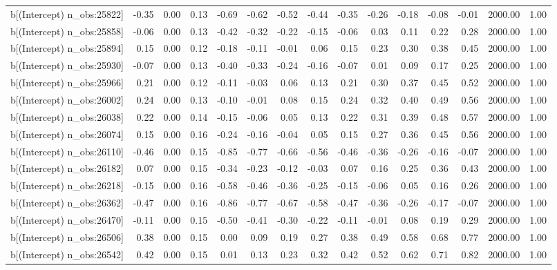 \begin{table}[ht]
\begin{tabular}{rrrrrrrrrrrrrrr}
  b[(Intercept) n\_obs:25822] & -0.35 & 0.00 & 0.13 & -0.69 & -0.62 & -0.52 & -0.44 & -0.35 & -0.26 & -0.18 & -0.08 & -0.01 & 2000.00 & 1.00 \\ 
  b[(Intercept) n\_obs:25858] & -0.06 & 0.00 & 0.13 & -0.42 & -0.32 & -0.22 & -0.15 & -0.06 & 0.03 & 0.11 & 0.22 & 0.28 & 2000.00 & 1.00 \\ 
  b[(Intercept) n\_obs:25894] & 0.15 & 0.00 & 0.12 & -0.18 & -0.11 & -0.01 & 0.06 & 0.15 & 0.23 & 0.30 & 0.38 & 0.45 & 2000.00 & 1.00 \\ 
  b[(Intercept) n\_obs:25930] & -0.07 & 0.00 & 0.13 & -0.40 & -0.33 & -0.24 & -0.16 & -0.07 & 0.01 & 0.09 & 0.17 & 0.25 & 2000.00 & 1.00 \\ 
  b[(Intercept) n\_obs:25966] & 0.21 & 0.00 & 0.12 & -0.11 & -0.03 & 0.06 & 0.13 & 0.21 & 0.30 & 0.37 & 0.45 & 0.52 & 2000.00 & 1.00 \\ 
  b[(Intercept) n\_obs:26002] & 0.24 & 0.00 & 0.13 & -0.10 & -0.01 & 0.08 & 0.15 & 0.24 & 0.32 & 0.40 & 0.49 & 0.56 & 2000.00 & 1.00 \\ 
  b[(Intercept) n\_obs:26038] & 0.22 & 0.00 & 0.14 & -0.15 & -0.06 & 0.05 & 0.13 & 0.22 & 0.31 & 0.39 & 0.48 & 0.57 & 2000.00 & 1.00 \\ 
  b[(Intercept) n\_obs:26074] & 0.15 & 0.00 & 0.16 & -0.24 & -0.16 & -0.04 & 0.05 & 0.15 & 0.27 & 0.36 & 0.45 & 0.56 & 2000.00 & 1.00 \\ 
  b[(Intercept) n\_obs:26110] & -0.46 & 0.00 & 0.15 & -0.85 & -0.77 & -0.66 & -0.56 & -0.46 & -0.36 & -0.26 & -0.16 & -0.07 & 2000.00 & 1.00 \\ 
  b[(Intercept) n\_obs:26182] & 0.07 & 0.00 & 0.15 & -0.34 & -0.23 & -0.12 & -0.03 & 0.07 & 0.16 & 0.25 & 0.36 & 0.43 & 2000.00 & 1.00 \\ 
  b[(Intercept) n\_obs:26218] & -0.15 & 0.00 & 0.16 & -0.58 & -0.46 & -0.36 & -0.25 & -0.15 & -0.06 & 0.05 & 0.16 & 0.26 & 2000.00 & 1.00 \\ 
  b[(Intercept) n\_obs:26362] & -0.47 & 0.00 & 0.16 & -0.86 & -0.77 & -0.67 & -0.58 & -0.47 & -0.36 & -0.26 & -0.17 & -0.07 & 2000.00 & 1.00 \\ 
  b[(Intercept) n\_obs:26470] & -0.11 & 0.00 & 0.15 & -0.50 & -0.41 & -0.30 & -0.22 & -0.11 & -0.01 & 0.08 & 0.19 & 0.29 & 2000.00 & 1.00 \\ 
  b[(Intercept) n\_obs:26506] & 0.38 & 0.00 & 0.15 & 0.00 & 0.09 & 0.19 & 0.27 & 0.38 & 0.49 & 0.58 & 0.68 & 0.77 & 2000.00 & 1.00 \\ 
  b[(Intercept) n\_obs:26542] & 0.42 & 0.00 & 0.15 & 0.01 & 0.13 & 0.23 & 0.32 & 0.42 & 0.52 & 0.62 & 0.71 & 0.82 & 2000.00 & 1.00 \\ 

\end{tabular}
\end{table}
